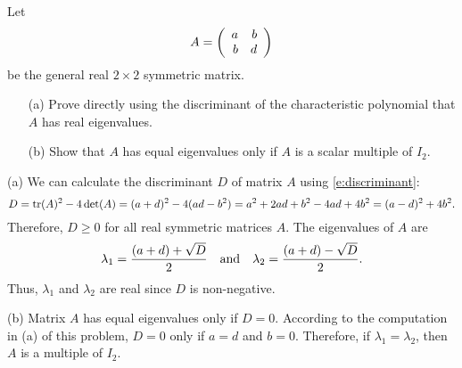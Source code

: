\documentclass{ximera}
\begin{document}
\begin{exercise} \label{c7.7.1}
Let
\[
A = \left(\begin{array}{rr} a & b\\ b &d\end{array}\right)
\]
be the general real $2\times 2$ symmetric matrix.
\begin{itemize}
\item[(a)]  Prove directly using the discriminant of the characteristic
polynomial that $A$ has real eigenvalues.
\item[(b)]  Show that $A$ has equal eigenvalues only if $A$ is a scalar
multiple of $I_2$.
\end{itemize}

\begin{solution}

(a) We can calculate the discriminant $D$ of matrix $A$ using
\eqref{e:discriminant}:
\[ D = {\rm tr}(A)^2 - 4\det(A) = (a + d)^2 - 4(ad - b^2) =
a^2 + 2ad + b^2 - 4ad + 4b^2 = (a - d)^2 + 4b^2. \]
Therefore, $D \geq 0$ for all real symmetric matrices $A$.  The
eigenvalues of $A$ are
\[ \lambda_1 = \frac{(a + d) + \sqrt{D}}{2} \quad\mbox{and}\quad
\lambda_2 = \frac{(a + d) - \sqrt{D}}{2}. \]
Thus, $\lambda_1$ and $\lambda_2$ are real since $D$ is non-negative.

(b) Matrix $A$ has equal eigenvalues only if $D = 0$.  According to
the computation in (a) of this problem, $D = 0$ only if $a = d$ and
$b = 0$.  Therefore, if $\lambda_1 = \lambda_2$, then $A$ is a
multiple of $I_2$.

\end{solution}
\end{exercise}
\end{document}
